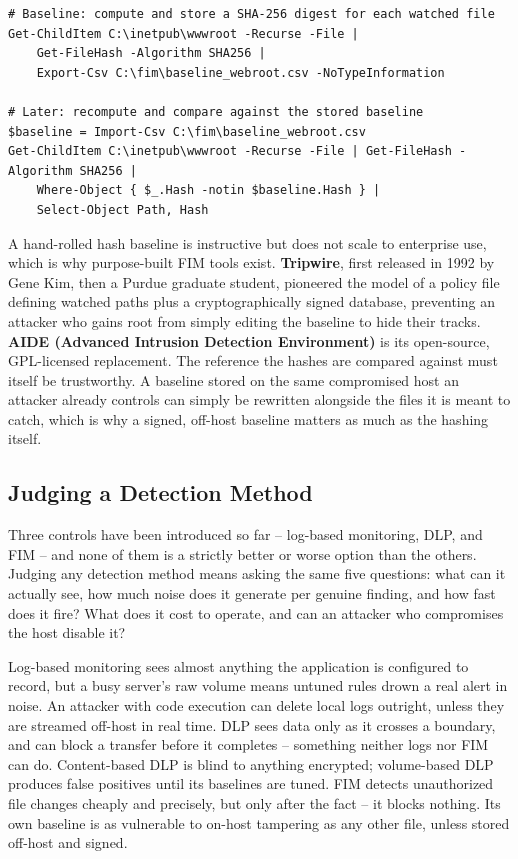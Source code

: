 \begin{lstlisting}[caption={The equivalent check on Windows with PowerShell}]
# Baseline: compute and store a SHA-256 digest for each watched file
Get-ChildItem C:\inetpub\wwwroot -Recurse -File |
    Get-FileHash -Algorithm SHA256 |
    Export-Csv C:\fim\baseline_webroot.csv -NoTypeInformation

# Later: recompute and compare against the stored baseline
$baseline = Import-Csv C:\fim\baseline_webroot.csv
Get-ChildItem C:\inetpub\wwwroot -Recurse -File | Get-FileHash -Algorithm SHA256 |
    Where-Object { $_.Hash -notin $baseline.Hash } |
    Select-Object Path, Hash
\end{lstlisting}

A hand-rolled hash baseline is instructive but does not scale to enterprise use, which is why
purpose-built FIM tools exist. \textbf{Tripwire}, first released in 1992 by Gene Kim, then a Purdue
graduate student, pioneered the model of a policy file defining watched paths plus a cryptographically
signed database, preventing an attacker who gains root from simply editing the baseline to hide
their tracks. \textbf{AIDE (Advanced Intrusion Detection Environment)} is its
open-source, GPL-licensed replacement. The reference the hashes are compared against
must itself be trustworthy. A baseline stored on the same compromised host an attacker already
controls can simply be rewritten alongside the files it is meant to catch, which is why a signed,
off-host baseline matters as much as the hashing itself.

\subsection{Judging a Detection Method}

Three controls have been introduced so far -- log-based monitoring, DLP, and FIM -- and none of
them is a strictly better or worse option than the others. Judging any detection method means
asking the same five questions: what can it actually see, how much noise does it generate per
genuine finding, and how fast does it fire? What does it cost to operate, and can an attacker who
compromises the host disable it?

Log-based monitoring sees almost anything the application is configured to record, but a busy
server's raw volume means untuned rules drown a real alert in noise. An attacker with code execution
can delete local logs outright, unless they are streamed off-host in real time. DLP sees data only
as it crosses a boundary, and can block a transfer before it completes -- something neither logs nor
FIM can do. Content-based DLP is blind to anything encrypted; volume-based DLP produces false
positives until its baselines are tuned. FIM detects unauthorized file changes cheaply and
precisely, but only after the fact -- it blocks nothing. Its own baseline is as vulnerable to on-host
tampering as any other file, unless stored off-host and signed.

